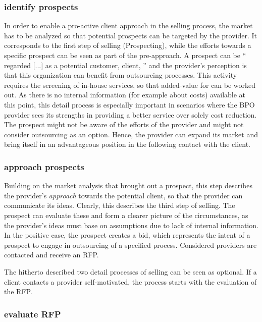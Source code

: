 	\subsubsection{identify prospects}
	In order to enable a pro-active client approach in the selling process, the market has to be analyzed so that potential prospects can be targeted by the provider. It corresponds to the first step of selling (Prospecting), while the efforts towards a specific prospect can be seen as part of the pre-approach. 
	A prospect can be \enquote{ regarded [...] as a potential customer, client, \etc} \citep{oxfordprospect} and the provider's perception is that this organization can benefit from outsourcing processes. This activity requires the screening of in-house services, so that added-value for can be worked out. As there is no internal information (for example about costs) available at this point, this detail process is especially important in scenarios where the \acrshort{BPO} provider sees its strengths in providing a better service over solely cost reduction. The prospect might not be aware of the efforts of the provider and might not consider outsourcing as an option. Hence, the provider can expand its market and bring itself in an advantageous position in the following contact with the client. 

	
	\subsubsection{approach prospects}
	
	Building on the market analysis that brought out a prospect, this step describes the provider's \textit{approach} towards the potential client, so that the provider can communicate its ideas. Clearly, this describes the third step of selling. The prospect can evaluate these and form a clearer picture of the circumstances, as the provider's ideas must base on assumptions due to lack of internal information. In the positive case, the prospect creates a bid, which represents the intent of a prospect to engage in outsourcing of a specified process. Considered providers are contacted and receive an \acrshort{RFP}. 
	
	The hitherto described two detail processes of selling can be seen as optional. If a client contacts a provider self-motivated, the process starts with the evaluation of the \acrshort{RFP}.
	
	\subsubsection{evaluate \acrshort{RFP}}
	
